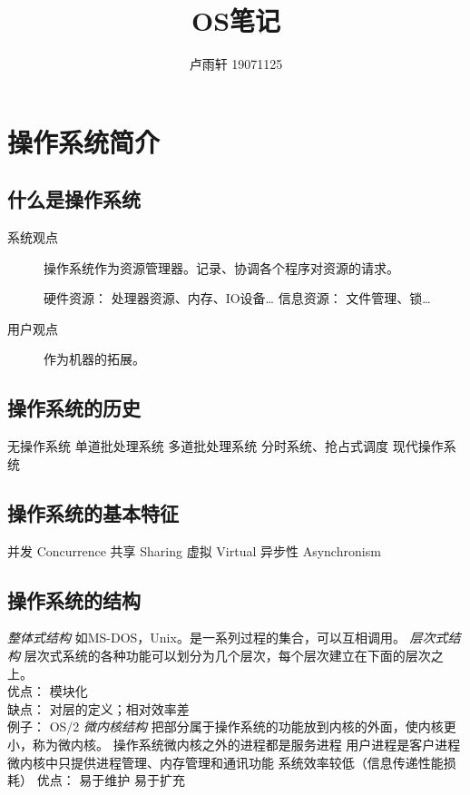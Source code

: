 \documentclass{ctexart}
\title{OS笔记}
\author{卢雨轩 19071125}
\begin{document}
\maketitle
\tableofcontents

\section{操作系统简介}

\subsection{什么是操作系统}

\begin{description}
    \item[系统观点] 操作系统作为资源管理器。记录、协调各个程序对资源的请求。
    \begin{outline}
        \1 硬件资源： 处理器资源、内存、IO设备\dots
        \1 信息资源： 文件管理、锁\dots
    \end{outline} 
    \item[用户观点] 作为机器的拓展。
\end{description}
\subsection{操作系统的历史}
\begin{outline}
    \1 无操作系统
    \1 单道批处理系统
    \1 多道批处理系统
    \1 分时系统、抢占式调度
    \1 现代操作系统
\end{outline}

\subsection{操作系统的基本特征}
\begin{outline}
    \1 并发 Concurrence
    \1 共享 Sharing
    \1 虚拟 Virtual
    \1 异步性 Asynchronism
\end{outline}

\subsection{操作系统的结构}
\begin{outline}
    \1 \emph{整体式结构} 如MS-DOS，Unix。是一系列过程的集合，可以互相调用。
    \1 \emph{层次式结构} 层次式系统的各种功能可以划分为几个层次，每个层次建立在下面的层次之上。 \\
    优点： 模块化 \\
    缺点： 对层的定义；相对效率差 \\
    例子： OS/2
    \1 \emph{微内核结构} 把部分属于操作系统的功能放到内核的外面，使内核更小，称为微内核。
        \2 操作系统微内核之外的进程都是服务进程
        \2 用户进程是客户进程
        \2 微内核中只提供进程管理、内存管理和通讯功能
        \2 系统效率较低（信息传递性能损耗）
    优点：
        \2 易于维护
        \2 易于扩充

\end{outline}
\end{document}
